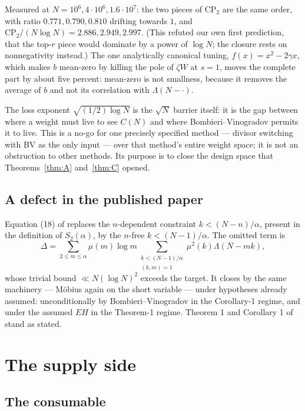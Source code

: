 \documentclass[11pt,a4paper]{article}
\theoremstyle{plain}
\theoremstyle{definition}
\begin{document}
Measured at $N=10^6,4\cdot10^6,1.6\cdot10^7$: the two pieces of
$\mathrm{CP}_2$ are the same order, with ratio $0.771,0.790,0.810$
drifting towards $1$, and $\mathrm{CP}_2/(N\log N) = 2.886, 2.949,
2.997$. (This refuted our own first prediction, that the top-$r$ piece
would dominate by a power of $\log N$; the closure rests on
nonnegativity instead.) The one analytically canonical tuning,
$f(x)=x^2-2\gamma x$, which makes $b$ mean-zero by killing the pole of
$\zeta W$ at $s=1$, moves the complete part by about five percent:
mean-zero is not smallness, because it removes the average of $b$ and
not its correlation with $\Lambda(N-\cdot)$.

The loss exponent $\sqrt{(1/2)\log N}$ is the $\sqrt N$ barrier itself:
it is the gap between where a weight must live to see $C(N)$ and where
Bombieri--Vinogradov permits it to live. This is a no-go for one
precisely specified method --- divisor switching with BV as the only
input --- over that method's entire weight space; it is not an
obstruction to other methods. Its purpose is to close the design space
that Theorems~\ref{thm:A} and~\ref{thm:C} opened.

\subsection{A defect in the published paper}

Equation (18) of \cite{HL} replaces the $n$-dependent constraint
$k < (N-n)/\alpha$, present in the definition of $S_2(\alpha)$, by the
$n$-free $k < (N-1)/\alpha$. The omitted term is
\[
  \Delta = \sum_{2\le m\le\alpha}\mu(m)\log m
    \sum_{\substack{k<(N-1)/\alpha\\ (k,m)=1}}\mu^2(k)\Lambda(N-mk),
\]
whose trivial bound $\ll N(\log N)^2$ exceeds the target. It closes by
the same machinery --- M\"obius again on the short variable --- under
hypotheses already assumed: unconditionally by Bombieri--Vinogradov in
the Corollary-1 regime, and under the assumed $EH$ in the Theorem-1
regime. Theorem 1 and Corollary 1 of \cite{HL} stand as stated.

\section{The supply side}\label{sec:supply}

\subsection{The consumable}
\end{document}
